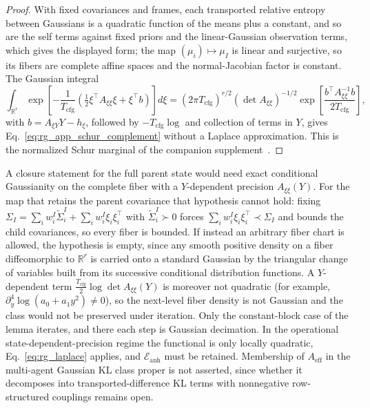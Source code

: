 \begin{proof}
With fixed covariances and frames, each transported relative entropy between Gaussians is a quadratic function of the means plus a constant, and so are the self terms against fixed priors and the linear-Gaussian observation terms, which gives the displayed form; the map $(\mu_i)\mapsto\mu_I$ is linear and surjective, so its fibers are complete affine spaces and the normal-Jacobian factor is constant. The Gaussian integral
\begin{equation}
\int_{\mathbb{R}^r}\exp\left[-\frac{1}{T_{\mathrm{cfg}}}\left(\tfrac12\xi^\top A_{\xi\xi}\xi+\xi^\top b\right)\right]d\xi
=(2\pi T_{\mathrm{cfg}})^{r/2}(\det A_{\xi\xi})^{-1/2}\exp\left[\frac{b^\top A_{\xi\xi}^{-1}b}{2T_{\mathrm{cfg}}}\right],
\end{equation}
with $b=A_{\xi Y}Y-h_\xi$, followed by $-T_{\mathrm{cfg}}\log$ and collection of terms in $Y$, gives Eq.~\eqref{eq:rg_app_schur_complement} without a Laplace approximation. This is the normalized Schur marginal of the companion supplement~\cite[Ch.~G7]{DennisGaugeVFESuppG2026}.
\end{proof}

\begin{remark}
A closure statement for the full parent state would need exact conditional Gaussianity on the complete fiber with a $Y$-dependent precision $A_{\xi\xi}(Y)$. For the map that retains the parent covariance that hypothesis cannot hold: fixing $\Sigma_I=\sum_iw_i^I\widetilde{\Sigma}_i^I+\sum_iw_i^I\xi_i\xi_i^\top$ with $\widetilde{\Sigma}_i^I\succ0$ forces $\sum_iw_i^I\xi_i\xi_i^\top\prec\Sigma_I$ and bounds the child covariances, so every fiber is bounded. If instead an arbitrary fiber chart is allowed, the hypothesis is empty, since any smooth positive density on a fiber diffeomorphic to $\mathbb{R}^r$ is carried onto a standard Gaussian by the triangular change of variables built from its successive conditional distribution functions. A $Y$-dependent term $\tfrac{T_{\mathrm{cfg}}}{2}\log\det A_{\xi\xi}(Y)$ is moreover not quadratic (for example, $\partial_y^4\log(a_0+a_1y^2)\neq0$), so the next-level fiber density is not Gaussian and the class would not be preserved under iteration. Only the constant-block case of the lemma iterates, and there each step is Gaussian decimation. In the operational state-dependent-precision regime the functional is only locally quadratic, Eq.~\eqref{eq:rg_laplace} applies, and $\mathcal{E}_{\mathrm{anh}}$ must be retained. Membership of $A_{\mathrm{eff}}$ in the multi-agent Gaussian KL class proper is not asserted, since whether it decomposes into transported-difference KL terms with nonnegative row-structured couplings remains open.
\end{remark}

